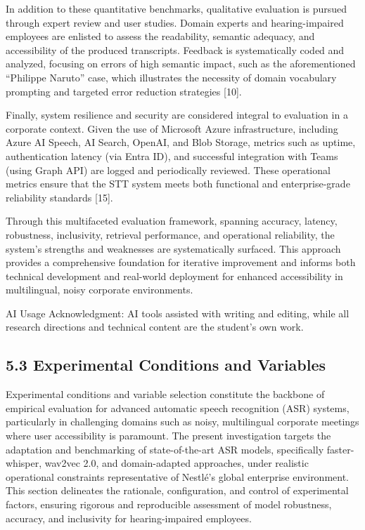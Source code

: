 \documentclass[12pt,a4paper]{article}
\begin{document}
In addition to these quantitative benchmarks, qualitative evaluation is pursued through expert review and user studies. Domain experts and hearing-impaired employees are enlisted to assess the readability, semantic adequacy, and accessibility of the produced transcripts. Feedback is systematically coded and analyzed, focusing on errors of high semantic impact, such as the aforementioned “Philippe Naruto” case, which illustrates the necessity of domain vocabulary prompting and targeted error reduction strategies [10].


Finally, system resilience and security are considered integral to evaluation in a corporate context. Given the use of Microsoft Azure infrastructure, including Azure AI Speech, AI Search, OpenAI, and Blob Storage, metrics such as uptime, authentication latency (via Entra ID), and successful integration with Teams (using Graph API) are logged and periodically reviewed. These operational metrics ensure that the STT system meets both functional and enterprise-grade reliability standards [15].


Through this multifaceted evaluation framework, spanning accuracy, latency, robustness, inclusivity, retrieval performance, and operational reliability, the system’s strengths and weaknesses are systematically surfaced. This approach provides a comprehensive foundation for iterative improvement and informs both technical development and real-world deployment for enhanced accessibility in multilingual, noisy corporate environments.


AI Usage Acknowledgment: AI tools assisted with writing and editing, while all research directions and technical content are the student’s own work.


\subsection{5.3 Experimental Conditions and Variables}


Experimental conditions and variable selection constitute the backbone of empirical evaluation for advanced automatic speech recognition (ASR) systems, particularly in challenging domains such as noisy, multilingual corporate meetings where user accessibility is paramount. The present investigation targets the adaptation and benchmarking of state-of-the-art ASR models, specifically faster-whisper, wav2vec 2.0, and domain-adapted approaches, under realistic operational constraints representative of Nestlé’s global enterprise environment. This section delineates the rationale, configuration, and control of experimental factors, ensuring rigorous and reproducible assessment of model robustness, accuracy, and inclusivity for hearing-impaired employees.
\end{document}
